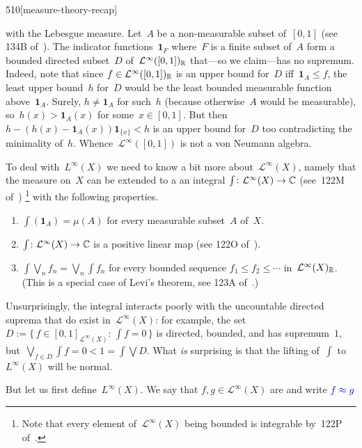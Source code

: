 \begin{parsec}{510}[measure-theory-recap]
\begin{point}{30}
with the Lebesgue measure.
Let~$A$ be a non-measurable
subset of~$[0,1]$ (see 134B of~\cite{fremlin}).
The indicator functions~$\mathbf{1}_F$
where~$F$ is a finite subset of~$A$
form a bounded directed subset~$D$ of~$\mathcal{L}^\infty([0,1])_{\mathbb{R}}$
that---so we claim---has no supremum.
Indeed, note that
since $f\in \mathcal{L}^\infty([0,1])_{\mathbb{R}}$
is an upper bound for~$D$ iff~$\mathbf{1}_A\leq f$,
the least upper bound~$h$ for~$D$
would be the least bounded measurable function above~$\mathbf{1}_A$.
Surely, $h\neq \mathbf{1}_A$
for such~$h$
(because otherwise~$A$ would be measurable),
so~$h(x)>\mathbf{1}_A(x)$ for some~$x\in [0,1]$.
But then $h - (h(x)-\mathbf{1}_A(x))\mathbf{1}_{\{x\}}<h$
is an upper bound for~$D$ too
contradicting the minimality of~$h$.
Whence~$\mathcal{L}^\infty([0,1])$
is not a von Neumann algebra.
\end{point}
\begin{point}{40}%
To deal with~$L^\infty(X)$
we need to know a bit more about~$\mathcal{L}^\infty(X)$,
namely that the measure on~$X$ can be extended to a
an integral $\int\colon \mathcal{L}^\infty(X)\to \mathbb{C}$
(see~122M of~\cite{fremlin})%
\footnote{Note that every element of~$\mathcal{L}^\infty(X)$
being bounded is integrable by~122P of~\cite{fremlin}.}
with the following properties.
\begin{enumerate}
\item
$\int(\mathbf{1}_A) = \mu(A)$
for every measurable subset~$A$ of~$X$.
\item
$\int\colon \mathcal{L}^\infty(X)\to \mathbb{C}$
is a positive linear map
(see 122O of~\cite{fremlin}).
\item
$\int \bigvee_n f_n = \bigvee_n \int f_n$
for every bounded sequence
$f_1\leq f_2\leq \dotsb$
in~$\mathcal{L}^\infty(X)_{\mathbb{R}}$.
(This is a special case
of Levi's theorem, see 123A of~\cite{fremlin}.)
\end{enumerate}
Unsurprisingly, the integral
interacts poorly
with the uncountable directed suprema
that do exist in~$\mathcal{L}^\infty(X)$:
for example, the set~$D:=\{\,f\in [0,1]_{\mathcal{L}^\infty(X)}\colon \,
\int f = 0\,\}$
is directed, bounded, and has supremum~$1$,
but~$\bigvee_{f\in D} \int f=0 < 1=\int \bigvee D$.
What \emph{is} surprising
is that the lifting of~$\int$
to~$L^\infty(X)$ will be normal.
\end{point}
\begin{point}{50}%
But let us first define~$L^\infty(X)$.
We say that $f,g\in \mathcal{L}^\infty(X)$
are 
and write $\Define{f\approx g}$%

\end{point}
\end{parsec}
